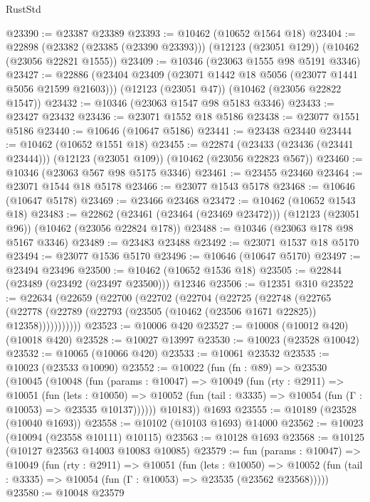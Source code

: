 \begin{lexlean}{RustStd}
\begin{coremodule}
@23390 := @23387 @23389
@23393 := @10462 (@10652 @1564 @18)
@23404 := @22898
    (@23382 (@23385 (@23390 @23393)))
    (@12123 (@23051 @129))
    (@10462 (@23056 @22821 @1555))
@23409 := @10346 (@23063 @1555 @98 @5191 @3346)
@23427 := @22886
    (@23404 @23409 (@23071 @1442 @18 @5056 (@23077 @1441 @5056 @21599 @21603)))
    (@12123 (@23051 @47))
    (@10462 (@23056 @22822 @1547))
@23432 := @10346 (@23063 @1547 @98 @5183 @3346)
@23433 := @23427 @23432
@23436 := @23071 @1552 @18 @5186
@23438 := @23077 @1551 @5186
@23440 := @10646 (@10647 @5186)
@23441 := @23438 @23440
@23444 := @10462 (@10652 @1551 @18)
@23455 := @22874
    (@23433 (@23436 (@23441 @23444)))
    (@12123 (@23051 @109))
    (@10462 (@23056 @22823 @567))
@23460 := @10346 (@23063 @567 @98 @5175 @3346)
@23461 := @23455 @23460
@23464 := @23071 @1544 @18 @5178
@23466 := @23077 @1543 @5178
@23468 := @10646 (@10647 @5178)
@23469 := @23466 @23468
@23472 := @10462 (@10652 @1543 @18)
@23483 := @22862
    (@23461 (@23464 (@23469 @23472)))
    (@12123 (@23051 @96))
    (@10462 (@23056 @22824 @178))
@23488 := @10346 (@23063 @178 @98 @5167 @3346)
@23489 := @23483 @23488
@23492 := @23071 @1537 @18 @5170
@23494 := @23077 @1536 @5170
@23496 := @10646 (@10647 @5170)
@23497 := @23494 @23496
@23500 := @10462 (@10652 @1536 @18)
@23505 := @22844 (@23489 (@23492 (@23497 @23500))) @12346
@23506 := @12351 @310
@23522 := @22634
    (@22659
      (@22700
        (@22702
          (@22704
            (@22725
              (@22748
                (@22765
                  (@22778 (@22789 (@22793 (@23505 (@10462 (@23506 @1671 @22825)) @12358)))))))))))
@23523 := @10006 @420
@23527 := @10008 (@10012 @420) (@10018 @420)
@23528 := @10027 @13997
@23530 := @10023 (@23528 @10042)
@23532 := @10065 (@10066 @420)
@23533 := @10061 @23532
@23535 := @10023 (@23533 @10090)
@23552 := @10022
    (fun (fn : @89) =>
    @23530
      (@10045
        (@10048
          (fun (params : @10047) =>
          @10049
            (fun (rty : @2911) =>
            @10051
              (fun (lets : @10050) =>
              @10052 (fun (tail : @3335) => @10054 (fun (Γ : @10053) => @23535 @10137))))))
        @10183))
    @1693
@23555 := @10189 (@23528 (@10040 @1693))
@23558 := @10102 (@10103 @1693) @14000
@23562 := @10023 (@10094 (@23558 @10111) @10115)
@23563 := @10128 @1693
@23568 := @10125 (@10127 @23563 @14003 @10083 @10085)
@23579 := fun (params : @10047) =>
  @10049
    (fun (rty : @2911) =>
    @10051
      (fun (lets : @10050) =>
      @10052 (fun (tail : @3335) => @10054 (fun (Γ : @10053) => @23535 (@23562 @23568)))))
@23580 := @10048 @23579

\end{coremodule}
\end{lexlean}
